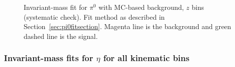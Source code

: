 \begin{figure}[H]
\label{fig:pi0zfit2}
\caption[Invariant-mass fit for $\pi^0$ with MC-based background, \(z\) bins]{Invariant-mass fit for $\pi^0$ with MC-based background, \(z\) bins (systematic check). Fit method as described in Section~\ref{sec:pi0fitsection}. Magenta line is the background and green dashed line is the signal.}
\end{figure}


\subsubsection{\texorpdfstring{Invariant-mass fits for $\eta$ for all kinematic bins}{Invariant-mass fits for eta for all kinematic bins}}

